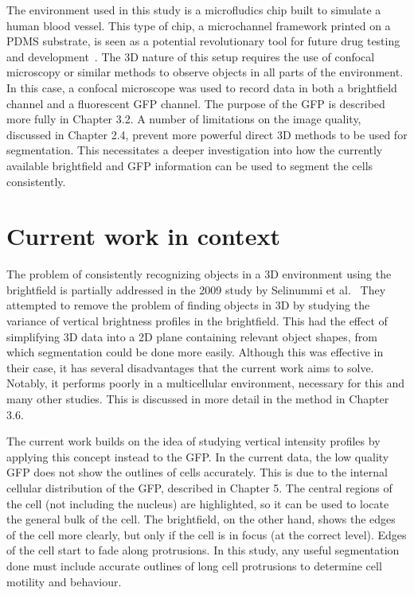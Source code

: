 The environment used in this study is a microfludics chip built to simulate a human blood vessel. This type of chip, a microchannel framework printed on a PDMS substrate, is seen as a potential revolutionary tool for future drug testing and development~\cite{Tsui:13}. The 3D nature of this setup requires the use of confocal microscopy or similar methods to observe objects in all parts of the environment. In this case, a confocal microscope was used to record data in both a brightfield channel and a fluorescent GFP channel. The purpose of the GFP is described more fully in Chapter 3.2. A number of limitations on the image quality, discussed in Chapter 2.4, prevent more powerful direct 3D methods to be used for segmentation. This necessitates a deeper investigation into how the currently available brightfield and GFP information can be used to segment the cells consistently.

\section{Current work in context}

The problem of consistently recognizing objects in a 3D environment using the brightfield is partially addressed in the 2009 study by Selinummi et al.~\cite{Selinummi:09} They attempted to remove the problem of finding objects in 3D by studying the variance of vertical brightness profiles in the brightfield. This had the effect of simplifying 3D data into a 2D plane containing relevant object shapes, from which segmentation could be done more easily. Although this was effective in their case, it has several disadvantages that the current work aims to solve. Notably, it performs poorly in a multicellular environment, necessary for this and many other studies. This is discussed in more detail in the method in Chapter 3.6.

The current work builds on the idea of studying vertical intensity profiles by applying this concept instead to the GFP. In the current data, the low quality GFP does not show the outlines of cells accurately. This is due to the internal cellular distribution of the GFP, described in Chapter 5. The central regions of the cell (not including the nucleus) are highlighted, so it can be used to locate the general bulk of the cell. The brightfield, on the other hand, shows the edges of the cell more clearly, but only if the cell is in focus (at the correct level). Edges of the cell start to fade along protrusions. In this study, any useful segmentation done must include accurate outlines of long cell protrusions to determine cell motility and behaviour.

